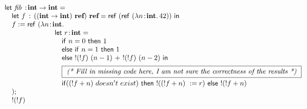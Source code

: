 \documentclass[10pt]{article}
\begin{document}
\begin{exercise}
\(
\begin{array}{l}
\lamfnt{let}~\mathit{fib}~\ty \typ{int} \arrow \typ{int} = \\
\quad \lamfnt{let}~f~\ty~((\typ{int} \arrow \typ{int})~\typ{ref})~\typ{ref} = \lamfnt{ref}~(\lamfnt{ref}~(\lam{n\ty\typ{int}}{42}))~\lamfnt{in}\\
\quad f := \lamfnt{ref}~(\lambda n\ty\typ{int}.\\
\hspace*{25mm} \lamfnt{let}~r \ty \typ{int} = \\
\hspace*{25mm} \quad \lamfnt{if}~n = 0~\lamfnt{then}~1\\ 
\hspace*{25mm} \quad \lamfnt{else}~\lamfnt{if}~n = 1~\lamfnt{then}~1\\ 
\hspace*{25mm} \quad \lamfnt{else}~!(!f)~(n-1)~+~!(!f)~(n-2)~\lamfnt{in}\\[.5em]
\hspace*{25mm} \quad \textit{\fbox{
(* Fill in missing code here, I am not sure the correctness of the results *)
}}\\[.5em]
\hspace*{25mm} \quad \lamfnt{if} ((!f + n) \ doesn't \ exist) \ \lamfnt{then} \ !((!f + n) \ := r) \ \lamfnt{else} \ !(!f + n)\\
\quad );\\
\quad !(!f)
\end{array}
\)
\end{exercise}
\end{document}
